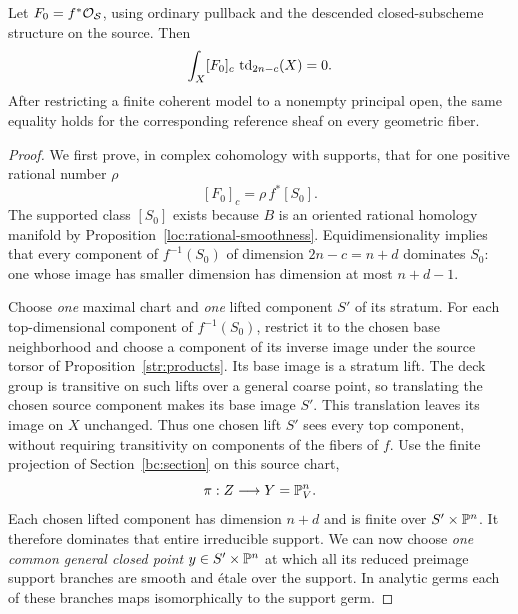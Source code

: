\begin{lemma}\label{eu:reference-number}
Let $F_0=f^*\mathcal O_{\mathcal S}$, using ordinary pullback and the descended
closed-subscheme structure on the source.  Then
\begin{equation}\label{eu:reference-vanishing}
        \int_X [F_0]_c\,\operatorname{td}_{2n-c}(X)=0.
\end{equation}
After restricting a finite coherent model to a nonempty principal
open, the same equality holds for the corresponding reference sheaf
on every geometric fiber.
\end{lemma}

\begin{proof}
We first prove, in complex cohomology with supports, that for one
positive rational number $\rho$
\begin{equation}\label{eu:cycle-comparison}
            [F_0]_c=\rho\,f^*[S_0].
\end{equation}
The supported class $[S_0]$ exists because $B$ is an oriented rational
homology manifold by Proposition~\ref{loc:rational-smoothness}.
Equidimensionality implies that every component of $f^{-1}(S_0)$ of
dimension $2n-c=n+d$ dominates $S_0$: one whose image has smaller
dimension has dimension at most $n+d-1$.

Choose \emph{one} maximal chart and \emph{one} lifted component $S'$
of its stratum.  For each top-dimensional component of $f^{-1}(S_0)$,
restrict it to the chosen base neighborhood and choose a component of
its inverse image under the source torsor of
Proposition~\ref{str:products}.  Its base image is a stratum lift.
The deck group is transitive on such lifts over a general coarse point,
so translating the chosen source component makes its base image $S'$.
This translation leaves its image on $X$ unchanged.  Thus one chosen
lift $S'$ sees every top component, without requiring transitivity on
components of the fibers of $f$.  Use the finite projection of
Section~\ref{bc:section} on this source chart,
\[
                  \pi:Z\longrightarrow Y=\mathbb P^n_V.
\]
Each chosen lifted component has dimension $n+d$ and is finite over
$S'\times\mathbb P^n$.  It therefore dominates that entire irreducible
support.  We can now choose \emph{one common general closed point}
$y\in S'\times\mathbb P^n$ at which all its reduced preimage support
branches are smooth and \'etale over the support.  In analytic germs
each of these branches maps isomorphically to the support germ.


\end{proof}
